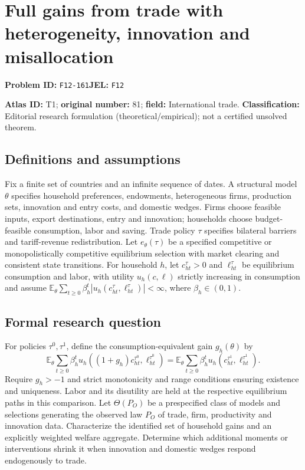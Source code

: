\documentclass[11pt,a4paper]{article}
\begin{document}
\section*{Full gains from trade with heterogeneity, innovation and misallocation}
\textbf{Problem ID:} \texttt{F12-161}\quad \textbf{JEL:} \texttt{F12}\par
\label{problem:OP-0081}
\label{audited:ECON-079}
\label{atlas:prob:T1}

\noindent\textbf{Atlas ID:} T1; \textbf{original number:} 81; \textbf{field:} International trade. \textbf{Classification:} Editorial research formulation (theoretical/empirical); not a certified unsolved theorem.

\subsection*{Definitions and assumptions}
Fix a finite set of countries and an infinite sequence of dates. A structural model $\theta$ specifies household preferences, endowments, heterogeneous firms, production sets, innovation and entry costs, and domestic wedges. Firms choose feasible inputs, export destinations, entry and innovation; households choose budget-feasible consumption, labor and saving. Trade policy $\tau$ specifies bilateral barriers and tariff-revenue redistribution. Let $e_\theta(\tau)$ be a specified competitive or monopolistically competitive equilibrium selection with market clearing and consistent state transitions. For household $h$, let $c_{ht}^\tau>0$ and $\ell_{ht}^\tau$ be equilibrium consumption and labor, with utility $u_h(c,\ell)$ strictly increasing in consumption and assume $\mathbb E_\theta\sum_{t\ge0}\beta_h^t|u_h(c_{ht}^\tau,\ell_{ht}^\tau)|<\infty$, where $\beta_h\in(0,1)$.

\subsection*{Formal research question}
For policies $\tau^0,\tau^1$, define the consumption-equivalent gain $g_h(\theta)$ by
\[
 \mathbb E_\theta\sum_{t\ge0}\beta_h^tu_h((1+g_h)c_{ht}^{\tau^0},\ell_{ht}^{\tau^0})
 =\mathbb E_\theta\sum_{t\ge0}\beta_h^tu_h(c_{ht}^{\tau^1},\ell_{ht}^{\tau^1}).
\]
Require $g_h>-1$ and strict monotonicity and range conditions ensuring existence and uniqueness. Labor and its disutility are held at the respective equilibrium paths in this comparison. Let $\Theta(P_O)$ be a prespecified class of models and selections generating the observed law $P_O$ of trade, firm, productivity and innovation data. Characterize the identified set of household gains and an explicitly weighted welfare aggregate. Determine which additional moments or interventions shrink it when innovation and domestic wedges respond endogenously to trade.
\end{document}
